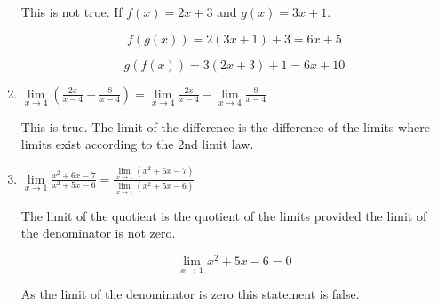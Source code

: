 \documentclass{article}
\begin{document}
\begin{enumerate}
		This is not true. If $f(x) = 2x + 3$ and $g(x) = 3x + 1$.

		$$f(g(x)) = 2(3x + 1) + 3 = 6x + 5$$

		$$g(f(x)) = 3(2x + 3) + 1 = 6x + 10$$

	\item $\lim \limits _{x \to 4} (\frac{2x}{x-4} - \frac{8}{x-4}) =
		\lim \limits _{x \to 4} \frac{2x}{x-4} - \lim \limits _{x \to 4} \frac{8}{x-4}$

		This is true. The limit of the difference is the difference of the limits where
		limits exist according to the 2nd limit law.

	\item $\lim \limits _{x \to 1} \frac{x^2 + 6x -7}{x^2 + 5x - 6} = 
		\frac{\lim \limits _{x \to 1} (x^2 + 6x -7)}{\lim \limits _{x \to 1} (x^2 + 5x - 6)}$

		The limit of the quotient is the quotient of the limits
		provided the limit of the denominator is not zero.

		$$\lim \limits _{x \to 1} x^2 + 5x - 6 = 0$$

		As the limit of the denominator is zero this statement is false.

\end{enumerate}
\end{document}
